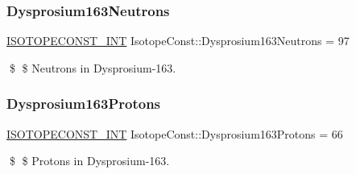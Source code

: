 \subsubsection{\texorpdfstring{Dysprosium163\+Neutrons}{Dysprosium163Neutrons}}
{\footnotesize\ttfamily \mbox{\hyperlink{group___isotope_const-_macros_ga5f18360b3e99483a35c32d789e62621c}{I\+S\+O\+T\+O\+P\+E\+C\+O\+N\+S\+T\+\_\+\+I\+NT}} Isotope\+Const\+::\+Dysprosium163\+Neutrons = 97}

\$ \$ Neutrons in Dysprosium-\/163. \mbox{\label{group___isotope_const-_dysprosium-_dy163_gac00d7b34c54d360570c14f4c178000b0}} 
\subsubsection{\texorpdfstring{Dysprosium163\+Protons}{Dysprosium163Protons}}
{\footnotesize\ttfamily \mbox{\hyperlink{group___isotope_const-_macros_ga5f18360b3e99483a35c32d789e62621c}{I\+S\+O\+T\+O\+P\+E\+C\+O\+N\+S\+T\+\_\+\+I\+NT}} Isotope\+Const\+::\+Dysprosium163\+Protons = 66}

\$ \$ Protons in Dysprosium-\/163. 